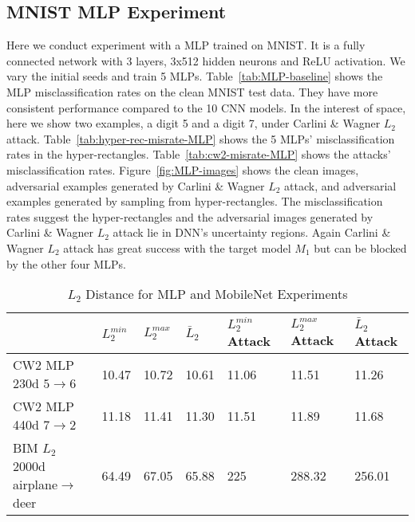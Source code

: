 \documentclass[12pt]{article}
\begin{document}
\subsection{MNIST MLP Experiment}
\label{sec:MLP}
Here we conduct experiment with a MLP trained on
MNIST. It is a fully connected network with 3 layers, 3x512 hidden neurons and ReLU
activation. We vary the initial seeds and train 5
MLPs. Table~\ref{tab:MLP-baseline} shows the MLP misclassification
rates on the clean MNIST test data. They have more consistent
performance compared to the 10 CNN
models. In the interest of space, here we
show two examples, a digit 5 and a digit 7, under Carlini \& Wagner $L_2$ attack. 
Table~\ref{tab:hyper-rec-misrate-MLP} shows the 5 
MLPs' misclassification rates in the
hyper-rectangles. Table~\ref{tab:cw2-misrate-MLP} shows the attacks'
misclassification rates. Figure~\ref{fig:MLP-images} shows the
clean images, adversarial examples generated by Carlini \& Wagner
$L_2$ attack, and adversarial examples generated by sampling from hyper-rectangles. 
The misclassification rates suggest the hyper-rectangles and the
adversarial images generated by Carlini \& Wagner $L_2$ attack lie in
DNN's uncertainty regions. Again Carlini \& Wagner $L_2$ attack has
great success with the target model $M_1$ but can be blocked by the
other four MLPs. 

%
\begin{table}[t]
\caption{$L_2$ Distance for MLP and MobileNet Experiments}
\label{tab:L2-mlp-cifar10}
\begin{center}
{\footnotesize  
\begin{tabular}{|l|lll|lll|} \hline
  &$L_2^{min}$ & $L_2^{max}$  &  $\bar{L}_2$ 
  &$L_2^{min}$ Attack& $L_2^{max}$ Attack & $\bar{L}_2$ Attack\\\hline
CW2 MLP 230d $5\to6$  & 10.47 & 10.72 & 10.61 &  11.06 &  11.51 & 11.26\\
CW2 MLP 440d $7\to2$   & 11.18 & 11.41 & 11.30  &  11.51 & 11.89 & 11.68\\ \hline
BIM $L_2$ 2000d airplane$\to$deer & 64.49 & 67.05 & 65.88 & 225 & 288.32 & 256.01  \\\hline
\end{tabular} }
\end{center}
\end{table}

%
\end{document}
